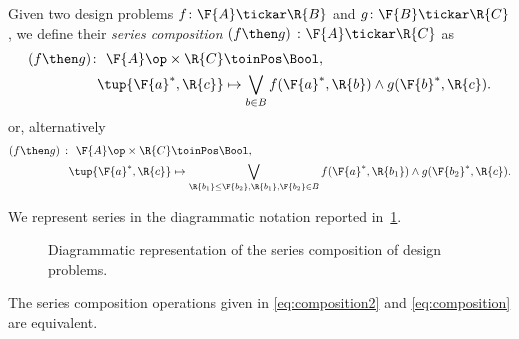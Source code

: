 \begin{definition}
\label{def:dp-series}
Given two design problems $f \colon  \F{A} \tickar \R{B}$ and $g \colon \F{B} \tickar \R{C}$, we define their \emph{series composition}
$(f\then g)\ \colon  \F{A} \tickar \R{C}$
as
\begin{equation}
\label{eq:composition2}
\begin{aligned}
   (f \then g)  \colon \ \F{A}\op \times \R{C} & \toinPos  \Bool, \\
  \tup{\F{a}^*, \R{c}} &\mapsto \bigvee_{b\in B} f(\F{a}^*,\R{b}) \wedge g(\F{b}^*,\R{c}).
\end{aligned}
\end{equation}
or, alternatively
\begin{equation}
\begin{aligned}
\label{eq:composition}
   (f \then g)\  \colon \ \F{A}\op \times \R{C} & \toinPos  \Bool,  \\
  \tup{\F{a}^*, \R{c}} &\mapsto \bigvee_{\R{b_1}\leq\F{b_2}, \R{b_1},\F{b_2}\in B} f(\F{a}^*,\R{b_1}) \wedge g(\F{b_2}^*,\R{c}).
\end{aligned}
\end{equation}
\end{definition}
\noindent We represent series in the diagrammatic notation reported in~\cref{fig:compositiondiagram}.
\begin{figure}[h!]
\begin{center}
\end{center}
\caption{Diagrammatic representation of the series composition of design problems. \label{fig:compositiondiagram}}
\end{figure}

\begin{lemma}
\label{lemma:composition_equivalency}
The series composition operations given in \cref{eq:composition2} and \cref{eq:composition} are equivalent.
\end{lemma}

